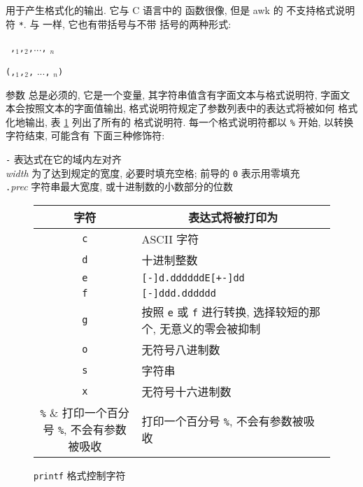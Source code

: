 \printf 用于产生格式化的输出. 它与 C 语言中的 \printf 函数很像, 但是 awk 
的 \printf 不支持格式说明符 \verb'*'. 与 \print 一样, 它也有带括号与不带
括号的两种形式:
\begin{pattern}
    \printf\ \fmt\verb','\expr$_1$\verb','\expr$_2$\verb','...\verb','
    \expr$_n$ \par 
    \printf\verb'('\fmt\verb','\expr$_1$\verb','\expr$_2$\verb','
    ...\verb',' \expr$_n$\verb')'
\end{pattern}
参数 \fmt 总是必须的, 它是一个变量, 其字符串值含有字面文本与格式说明符,
字面文本会按照文本的字面值输出, 格式说明符规定了参数列表中的表达式将被如何
格式化地输出, 表 \ref{tbl:printf_format_control_characters} 列出了所有的
格式说明符. 每一个格式说明符都以 \verb'%' 开始, 以转换字符结束, 可能含有
下面三种修饰符:
\begin{tabbing}
    \indent\verb'-' \hspace{4em} \= 表达式在它的域内左对齐 \\
    \indent\textit{width}  \> 为了达到规定的宽度, 必要时填充空格; 前导的 \verb'0'
    表示用零填充 \\
    \indent\verb'.'\textit{prec}   \> 字符串最大宽度, 或十进制数的小数部分的位数
\end{tabbing}
\begin{figure}
        \captionsetup{type=table}
        \caption{\texttt{printf} 格式控制字符}
        \label{tbl:printf_format_control_characters}
\begin{center}
        \begin{tabular}{c|l}
            \hline
            \hline
            字符    & \multicolumn{1}{c}{表达式将被打印为} \\
            \hline
            \verb'c' & ASCII 字符 \\
            \verb'd' & 十进制整数 \\
            \verb'e' & \verb'[-]d.ddddddE[+-]dd' \\
            \verb'f' & \verb'[-]ddd.dddddd' \\
            \verb'g' & 按照 \verb'e' 或 \verb'f' 进行转换, 选择较短的那个,
                无意义的零会被抑制 \\
            \verb'o' & 无符号八进制数 \\
            \verb's' & 字符串 \\
            \verb'x' & 无符号十六进制数 \\
            \verb'%' & 打印一个百分号 \verb'%', 不会有参数被吸收 \\
            \hline
        \end{tabular}
\end{center}
    \end{figure}
